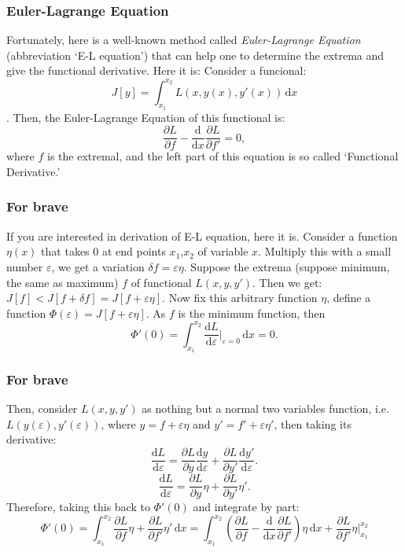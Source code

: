 \documentclass[compress]{beamer}
\begin{document}
\begin{frame}
  \frametitle{Euler-Lagrange Equation}
  Fortunately, here is a well-known method called \emph{Euler-Lagrange Equation} (abbreviation `E-L equation') that can help one to determine the extrema and give the functional derivative.
  Here it is:
  \bigbreak
  Consider a funcional: \[J\left[ y \right] = \int_{x_1}^{x_2} L(x,y(x),y'(x))\,\mathrm{d}x\].
  Then, the Euler-Lagrange Equation of this functional is:
  \[\frac{\partial L}{\partial f} - \frac{\mathrm{d}}{\mathrm{d} x}\frac{\partial L}{\partial f'}=0,\]
  where \(f\) is the extremal, and the left part of this equation is so called `Functional Derivative.'
\end{frame}

\begin{frame}
  \frametitle{For brave}
  If you are interested in derivation of E-L equation, here it is.
  \bigbreak
  Consider a function \(\eta(x)\) that takes \(0\) at end points \(x_1\),\(x_2\) of variable \(x\). Multiply this with a small number \(\varepsilon\),
  we get a variation \(\delta f = \varepsilon\eta\). Suppose the extrema (suppose minimum, the same as maximum)
  \(f\) of functional \(L(x,y,y')\). Then we get:
  \(J\left[ f \right] < J\left[ f+\delta f \right] = J\left[ f+\varepsilon\eta \right]\).
  Now fix this arbitrary function \(\eta\), define a function \(\Phi\left( \varepsilon \right) = J\left[ f+\varepsilon\eta \right].\)
  As \(f\) is the minimum function, then
  \[\Phi'\left( 0 \right) = \int_{x_1}^{x_2} \frac{\mathrm{d} L}{\mathrm{d} \varepsilon}\Big|_{\varepsilon= 0}  \,\mathrm{d}x = 0.\]

\end{frame}

\begin{frame}
  \frametitle{For brave}
  Then, consider \(L(x,y,y')\) as nothing but a normal two variables function, i.e. \(L(y(\varepsilon),y'(\varepsilon))\), where \(y = f+\varepsilon\eta\) and \(y' = f'+\varepsilon\eta'\), then taking its derivative:
  \[\frac{\mathrm{d} L}{\mathrm{d} \varepsilon} = \frac{\partial L}{\partial y}\frac{\mathrm{d} y}{\mathrm{d} \varepsilon}+\frac{\partial L}{\partial y'}\frac{\mathrm{d} y'}{\mathrm{d} \varepsilon}.\]
  \[\frac{\mathrm{d} L}{\mathrm{d} \varepsilon} = \frac{\partial L}{\partial y}\eta+\frac{\partial L}{\partial y'}\eta'.\]
  Therefore, taking this back to \(\Phi'(0)\) and integrate by part:
  \[\Phi'\left( 0 \right) = \int_{x_1}^{x_2} \frac{\partial L}{\partial f}\eta+\frac{\partial L}{\partial f'}\eta'\,\mathrm{d}x =
    \int_{x_1}^{x_2} \left( \frac{\partial L}{\partial f}-\frac{\mathrm{d} }{\mathrm{d} x}\frac{\partial L}{\partial f'} \right)\eta\,\mathrm{d}x+\frac{\partial L}{\partial f'}\eta\Big|_{x_1}^{x_2}\]
\end{frame}
\end{document}
